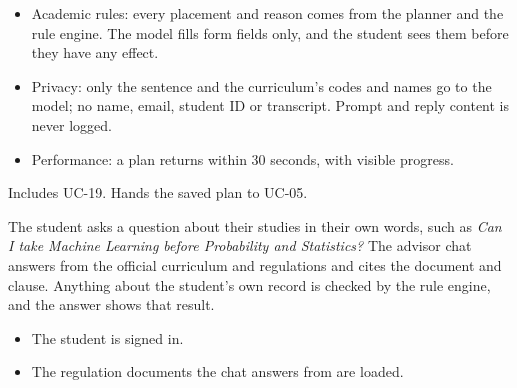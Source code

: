 \begin{itemize}
  \item Academic rules: every placement and reason comes from the planner and the rule engine. The model fills form fields
        only, and the student sees them before they have any effect.
  \item Privacy: only the sentence and the curriculum's codes and names go to the model; no name, email, student ID or
        transcript. Prompt and reply content is never logged.
  \item Performance: a plan returns within 30 seconds, with visible progress.
\end{itemize}

Includes UC-19. Hands the saved plan to UC-05.


The student asks a question about their studies in their own words, such as \emph{Can I take Machine Learning before
Probability and Statistics?} The advisor chat answers from the official curriculum and regulations and cites the document
and clause. Anything about the student's own record is checked by the rule engine, and the answer shows that result.

\begin{itemize}
  \item The student is signed in.
  \item The regulation documents the chat answers from are loaded.
\end{itemize}

